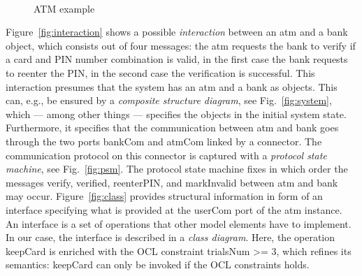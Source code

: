 \documentclass[10pt,fleqn,%
\ifpretendfinal
final%
\else
draft%
\fi,
]{scrreprt}
\newcommand{\uml}[1]{\textsf{#1}}
\begin{document}
\begin{figure}[!Ht]
{}
\\
\vspace*{-1.5ex}
\caption{ATM example}\label{fig:atm-example}
\end{figure}

Figure~\ref{fig:interaction} shows a possible \emph{interaction}
between an \uml{atm} and a \uml{bank} object, which consists out of
four messages: the \uml{atm} requests the \uml{bank} to \uml{verify}
if a card and PIN number combination is valid, in the first case the
\uml{bank} requests to reenter the PIN, in the second case the
verification is successful.  This interaction presumes that the system
has an \uml{atm} and a \uml{bank} as objects. This can, e.g., be
ensured by a \emph{composite structure diagram}, see
Fig.~\ref{fig:system}, which --- among other things --- specifies the
objects in the initial system state.  Furthermore, it specifies that
the communication between \uml{atm} and \uml{bank} goes through the
two ports \uml{bankCom} and \uml{atmCom} linked by a connector.  The
communication protocol on this connector is captured with a
\emph{protocol state machine}, see Fig.~\ref{fig:psm}.  The protocol
state machine fixes in which order the messages \uml{verify},
\uml{verified}, \uml{reenterPIN}, and \uml{markInvalid} between
\uml{atm} and \uml{bank} may occur.  Figure~\ref{fig:class} provides
structural information in form of an interface specifying what is
provided at the \uml{userCom} port of the \uml{atm} instance. An
interface is a set of operations that other model elements have to
implement. In our case, the interface is described in a \emph{class
  diagram}. Here, the operation \uml{keepCard} is enriched with the
OCL constraint \uml{trialsNum >= 3}, which refines its semantics:
\uml{keepCard} can only be invoked if the OCL constraints holds.
\end{document}
